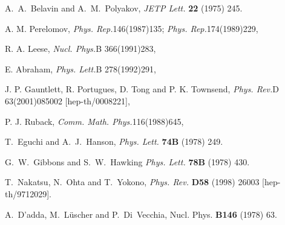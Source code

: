 \documentclass[a4paper,12pt]{article}
\begin{document}
\begin{thebibliography}{100}
A.~A.~Belavin and A.~M.~Polyakov, 
{\em JETP Lett.} {\bf 22} (1975) 245. 

A. M. Perelomov,
               {\em Phys. Rep.}{146}(1987)135; 
               {\em Phys. Rep.}{174}(1989)229,

R. A. Leese,
              {\em Nucl. Phys.}{B 366}(1991)283,
 
E. Abraham, 
              {\em Phys. Lett.}{B 278}(1992)291,
 
J. P. Gauntlett, R. Portugues, D. Tong and P. K. Townsend,
              {\em Phys. Rev.}{D 63}(2001)085002
              [hep-th/0008221],

P. J. Ruback,
              {\em Comm. Math. Phys.}{116}(1988)645,



T.~Eguchi and A.~J.~Hanson, 
{\em Phys. Lett.} {\bf 74B} (1978) 249. 

G.~W.~Gibbons and S.~W.~Hawking
{\em Phys. Lett.} {\bf 78B} (1978) 430. 

T.~Nakatsu, N.~Ohta and T.~Yokono,  
{\em Phys. Rev.} {\bf D58} (1998) 26003 
[hep-th/9712029]. 
%

A.~D'adda, M.~L\"{u}scher and 
P.~Di~Vecchia, 
Nucl. Phys. {\bf B146} (1978) 63.


\end{thebibliography}
\end{document}
